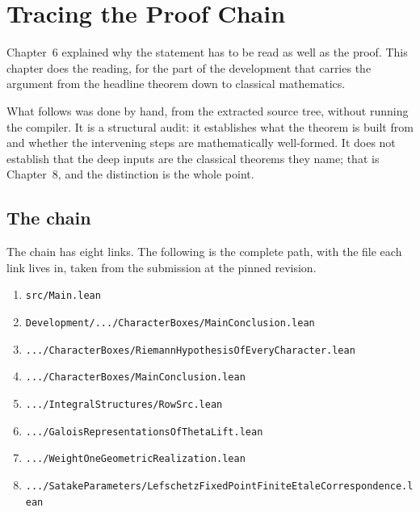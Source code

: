 
\chapter{Tracing the Proof Chain}
\label{ch:chain}

Chapter~6 explained why the statement has to be read as well as the proof. This
chapter does the reading, for the part of the development that carries the
argument from the headline theorem down to classical mathematics.

What follows was done by hand, from the extracted source tree, without running
the compiler. It is a structural audit: it establishes what the theorem is
built from and whether the intervening steps are mathematically well-formed. It
does not establish that the deep inputs are the classical theorems they name;
that is Chapter~8, and the distinction is the whole point.

\section{The chain}The chain has eight links. The following is the complete path, with the file
each link lives in, taken from the submission at the pinned revision.

\begin{center}
{\small
\begin{enumerate}[leftmargin=1.7em,label=\arabic*.,itemsep=3pt,topsep=2pt]
\item {}
      \quad\normalfont\texttt{src/Main.lean}
\item {}
      \quad\normalfont\texttt{Development/.../CharacterBoxes/MainConclusion.lean}
\item {}
      \quad\normalfont\texttt{.../CharacterBoxes/RiemannHypothesisOfEveryCharacter.lean}
\item {}
      \quad\normalfont\texttt{.../CharacterBoxes/MainConclusion.lean}
\item {}
      \quad\normalfont\texttt{.../IntegralStructures/RowSrc.lean}
\item {}
      \quad\normalfont\texttt{.../GaloisRepresentationsOfThetaLift.lean}
\item {}
      \quad\normalfont\texttt{.../WeightOneGeometricRealization.lean}
\item {}
      \quad\normalfont\texttt{.../SatakeParameters/LefschetzFixedPointFiniteEtaleCorrespondence.lean}
\end{enumerate}
}
\end{center}

